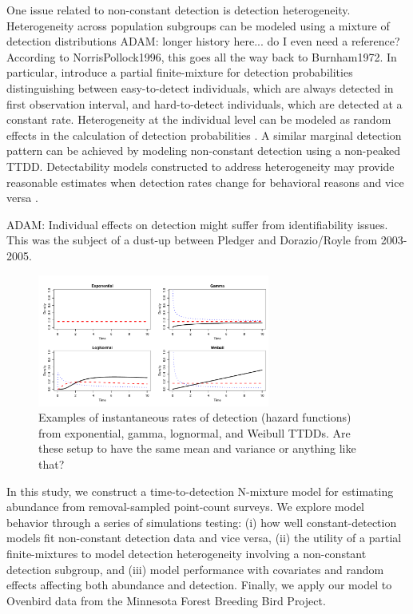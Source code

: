 \documentclass[useAMS,usenatbib,referee,12pt]{article}
\newcommand{\adam}[1]{{\color{blue} ADAM: #1}}
\newcommand{\jarad}[1]{{\color{red} #1}}
\begin{document}
One issue related to non-constant detection is detection heterogeneity.  Heterogeneity across population subgroups can be modeled using a mixture of detection distributions \citep{Pledger2000}\adam{longer history here... do I even need a reference? According to NorrisPollock1996, this goes all the way back to Burnham1972}.  In particular, \citet{Farnsworth2002} introduce a partial finite-mixture for detection probabilities distinguishing between easy-to-detect individuals, which are always detected in first observation interval, and hard-to-detect individuals, which are detected at a constant rate.   Heterogeneity at the individual level can be modeled as random effects in the calculation of detection probabilities \citep{DorazioRoyle2003, Mantyniemi2005}.  A similar marginal detection pattern can be achieved by modeling non-constant detection using a non-peaked TTDD.  Detectability models constructed to address heterogeneity may provide reasonable estimates when detection rates change for behavioral reasons and vice versa \citep{Mantyniemi2005}.

\adam{Individual effects on detection might suffer from identifiability issues. This was the subject of a dust-up between Pledger and Dorazio/Royle from 2003-2005.}

\begin{figure}[h!]\centering
\includegraphics[width=0.68\textwidth]{Hazards}
\caption{Examples of instantaneous rates of detection (hazard functions) from exponential, gamma, lognormal, and Weibull TTDDs. \jarad{Are these setup to have the same mean and variance or anything like that?}}
\label{HazardFxns}
\end{figure}

In this study, we construct a time-to-detection N-mixture model for estimating abundance from removal-sampled point-count surveys.  We explore model behavior through a series of simulations testing: (i) how well constant-detection models fit non-constant detection data and vice versa, (ii) the utility of a partial finite-mixtures to model detection heterogeneity involving a non-constant detection subgroup, and (iii) model performance with covariates and random effects affecting both abundance and detection.  Finally, we apply our model to Ovenbird data from the Minnesota Forest Breeding Bird Project.
\end{document}
